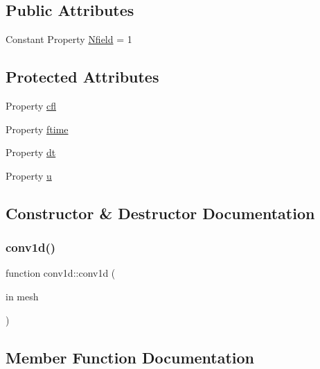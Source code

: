 \subsection*{Public Attributes}
\begin{DoxyCompactItemize}
\item 
Constant Property \hyperlink{classconv1d_a7f1670988008db1e4e5265f067f4479b}{Nfield} = 1
\end{DoxyCompactItemize}
\subsection*{Protected Attributes}
\begin{DoxyCompactItemize}
\item 
Property \hyperlink{classconv1d_a825a4733cc687e6bb21761db4fc18464}{cfl}
\item 
Property \hyperlink{classconv1d_a14e36ea9e24c4edb42b697488f646045}{ftime}
\item 
Property \hyperlink{classconv1d_adf437888f16fbfd326f087077cf022d5}{dt}
\item 
Property \hyperlink{classconv1d_ac5c4990e0891351a2831da5e8845d0d2}{u}
\end{DoxyCompactItemize}


\subsection{Constructor \& Destructor Documentation}
\mbox{\label{classconv1d_aaaf10511813f52fdd403c6b1fcd583bd}} 
\subsubsection{\texorpdfstring{conv1d()}{conv1d()}}
{\footnotesize\ttfamily function conv1d\+::conv1d (\begin{DoxyParamCaption}\item[{in}]{mesh }\end{DoxyParamCaption})}



\subsection{Member Function Documentation}
\mbox{\label{classconv1d_a8a2a102c6d68a467cefe7db537a971bc}} 
